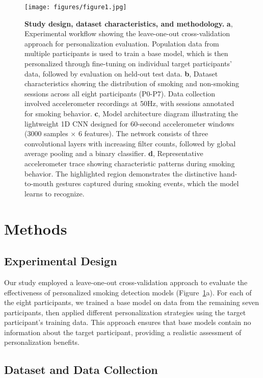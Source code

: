 \documentclass[11pt]{article}
\begin{document}
\begin{figure}[htbp]
    \centering
    \texttt{[image: figures/figure1.jpg]}
    \caption{\textbf{Study design, dataset characteristics, and methodology.}
    \textbf{a}, Experimental workflow showing the leave-one-out cross-validation approach for personalization evaluation. Population data from multiple participants is used to train a base model, which is then personalized through fine-tuning on individual target participants' data, followed by evaluation on held-out test data.
    \textbf{b}, Dataset characteristics showing the distribution of smoking and non-smoking sessions across all eight participants (P0-P7). Data collection involved accelerometer recordings at 50Hz, with sessions annotated for smoking behavior.
    \textbf{c}, Model architecture diagram illustrating the lightweight 1D CNN designed for 60-second accelerometer windows (3000 samples × 6 features). The network consists of three convolutional layers with increasing filter counts, followed by global average pooling and a binary classifier.
    \textbf{d}, Representative accelerometer trace showing characteristic patterns during smoking behavior. The highlighted region demonstrates the distinctive hand-to-mouth gestures captured during smoking events, which the model learns to recognize.}
    \label{fig:study_design}
\end{figure}

\section{Methods}

\subsection{Experimental Design}

Our study employed a leave-one-out cross-validation approach to evaluate the effectiveness of personalized smoking detection models (Figure~\ref{fig:study_design}a). For each of the eight participants, we trained a base model on data from the remaining seven participants, then applied different personalization strategies using the target participant's training data. This approach ensures that base models contain no information about the target participant, providing a realistic assessment of personalization benefits.

\subsection{Dataset and Data Collection}
\end{document}
